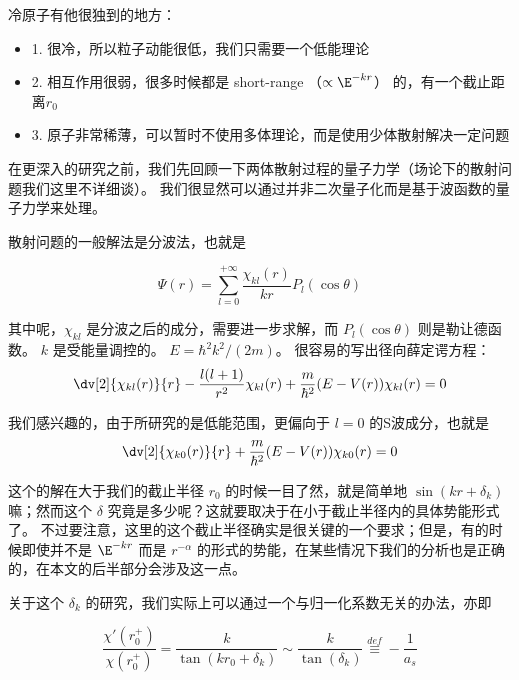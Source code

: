 
冷原子有他很独到的地方：
\begin{itemize}
\item 1. 很冷，所以粒子动能很低，我们只需要一个低能理论
\item 2. 相互作用很弱，很多时候都是 short-range （$\propto \E^{-kr}$） 的，有一个截止距离$r_0$
\item 3. 原子非常稀薄，可以暂时不使用多体理论，而是使用少体散射解决一定问题
\end{itemize}

在更深入的研究之前，我们先回顾一下两体散射过程的量子力学（场论下的散射问题我们这里不详细谈）。 我们很显然可以通过并非二次量子化而是基于波函数的量子力学来处理。

散射问题的一般解法是分波法，也就是

\begin{equation}
\Psi(r) = \sum_{l=0}^{+\infty}\frac{\chi_{kl}(r)}{kr}P_l(\cos\theta) 
\end{equation}

其中呢，$\chi_{kl}$ 是分波之后的成分，需要进一步求解，而 $P_l(\cos\theta)$ 则是勒让德函数。 $k$ 是受能量调控的。 $E=\hbar^2 k^2/(2m)$。 很容易的写出径向薛定谔方程：
\begin{equation}
\dv[2]{\chi_{kl}(r)}{r} - \frac{l(l+1)}{r^2}\chi_{kl}(r) + \frac{m}{\hbar^2}(E-V(r))\chi_{kl}(r) = 0
\end{equation}

我们感兴趣的，由于所研究的是低能范围，更偏向于 $l=0$ 的S波成分，也就是
\begin{equation}
\dv[2]{\chi_{k0}(r)}{r}+ \frac{m}{\hbar^2}(E-V(r))\chi_{k0}(r) = 0
\end{equation}

这个的解在大于我们的截止半径 $r_0$ 的时候一目了然，就是简单地 $\sin(kr + \delta_k)$ 嘛；然而这个 $\delta$ 究竟是多少呢？这就要取决于在小于截止半径内的具体势能形式了。 不过要注意，这里的这个截止半径确实是很关键的一个要求；但是，有的时候即使并不是 $\E^{-kr}$ 而是 $r^{-\alpha}$ 的形式的势能，在某些情况下我们的分析也是正确的，在本文的后半部分会涉及这一点。

关于这个 $\delta_k$ 的研究，我们实际上可以通过一个与归一化系数无关的办法，亦即

\begin{equation}
\frac{\chi'(r_0^+)}{\chi(r_0^+)} = \frac{k}{\tan(k r_0 +\delta_k)} \sim \frac{k}{\tan(\delta_k)} \overset{def}{\equiv} -\frac{1}{a_s} 
\end{equation}

